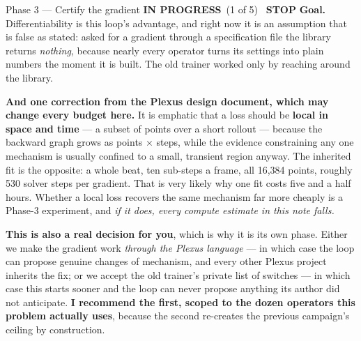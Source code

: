 \documentclass[11pt,a4paper]{article}
\newcommand{\prog}{\textcolor{warn}{\textbf{IN PROGRESS}}}
\newcommand{\stopp}{\textcolor{bad!30!white}{\textbf{STOP}}}
\begin{document}
\begin{phasebox}{Phase 3 --- Certify the gradient \hfill \prog\ (1 of 5) \ \stopp}
\textbf{Goal.} Differentiability is this loop's advantage, and right now it is an assumption that is
false as stated: asked for a gradient through a specification file the library returns
\emph{nothing}, because nearly every operator turns its settings into plain numbers the moment it is
built. The old trainer worked only by reaching around the library.

\textbf{And one correction from the Plexus design document, which may change every budget here.} It
is emphatic that a loss should be \textbf{local in space and time} --- a subset of points over a
short rollout --- because the backward graph grows as points $\times$ steps, while the evidence
constraining any one mechanism is usually confined to a small, transient region anyway. The
inherited fit is the opposite: a whole beat, ten sub-steps a frame, all 16{,}384 points, roughly 530
solver steps per gradient. That is very likely why one fit costs five and a half hours. Whether a
local loss recovers the same mechanism far more cheaply is a Phase-3 experiment, and \emph{if it
does, every compute estimate in this note falls.}

\textbf{This is also a real decision for you}, which is why it is its own phase. Either we make the
gradient work \emph{through the Plexus language} --- in which case the loop can propose genuine
changes of mechanism, and every other Plexus project inherits the fix; or we accept the old
trainer's private list of switches --- in which case this starts sooner and the loop can never
propose anything its author did not anticipate. \textbf{I recommend the first, scoped to the dozen
operators this problem actually uses}, because the second re-creates the previous campaign's ceiling
by construction.


\end{phasebox}
\end{document}
